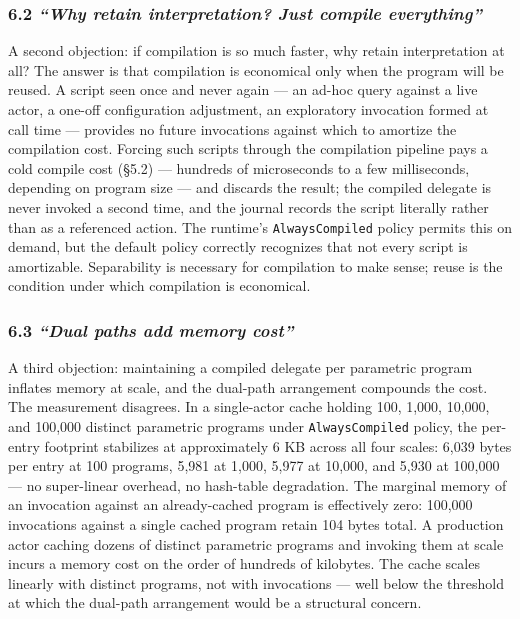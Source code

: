 \documentclass[
]{article}
\let\origtexttt\texttt%
\renewcommand{\texttt}[1]{\origtexttt{\seqsplit{#1}}}%
\let\texttt\origtexttt%
\begin{document}
\subsubsection{\texorpdfstring{6.2 \emph{``Why retain interpretation?
Just compile
everything''}}{6.2 ``Why retain interpretation? Just compile everything''}}\label{why-retain-interpretation-just-compile-everything}

A second objection: if compilation is so much faster, why retain
interpretation at all? The answer is that compilation is economical only
when the program will be reused. A script seen once and never again ---
an ad-hoc query against a live actor, a one-off configuration
adjustment, an exploratory invocation formed at call time --- provides
no future invocations against which to amortize the compilation cost.
Forcing such scripts through the compilation pipeline pays a cold
compile cost (§5.2) --- hundreds of microseconds to a few milliseconds,
depending on program size --- and discards the result; the compiled
delegate is never invoked a second time, and the journal records the
script literally rather than as a referenced action. The runtime's
\texttt{AlwaysCompiled} policy permits this on demand, but the default
policy correctly recognizes that not every script is amortizable.
Separability is necessary for compilation to make sense; reuse is the
condition under which compilation is economical.

\subsubsection{\texorpdfstring{6.3 \emph{``Dual paths add memory
cost''}}{6.3 ``Dual paths add memory cost''}}\label{dual-paths-add-memory-cost}

A third objection: maintaining a compiled delegate per parametric
program inflates memory at scale, and the dual-path arrangement
compounds the cost. The measurement disagrees. In a single-actor cache
holding 100, 1,000, 10,000, and 100,000 distinct parametric programs
under \texttt{AlwaysCompiled} policy, the per-entry footprint stabilizes
at approximately 6 KB across all four scales: 6,039 bytes per entry at
100 programs, 5,981 at 1,000, 5,977 at 10,000, and 5,930 at 100,000 ---
no super-linear overhead, no hash-table degradation. The marginal memory
of an invocation against an already-cached program is effectively zero:
100,000 invocations against a single cached program retain 104 bytes
total. A production actor caching dozens of distinct parametric programs
and invoking them at scale incurs a memory cost on the order of hundreds
of kilobytes. The cache scales linearly with distinct programs, not with
invocations --- well below the threshold at which the dual-path
arrangement would be a structural concern.
\end{document}
